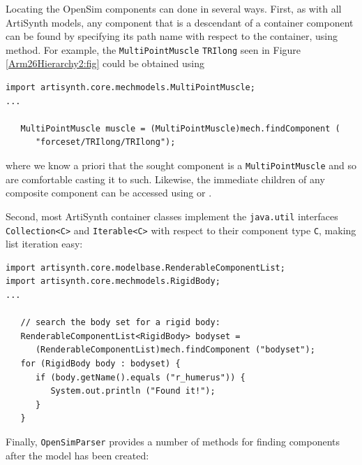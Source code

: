 Locating the OpenSim components can done in several ways.  First, as with all
ArtiSynth models, any component that is a descendant of a container component
can be found by specifying its path name with respect to the container, using
 method. For example,
the {\tt MultiPointMuscle} {\tt TRIlong} seen in Figure \ref{Arm26Hierarchy2:fig}
could be obtained using
%
\begin{lstlisting}[]
import artisynth.core.mechmodels.MultiPointMuscle;
...

   MultiPointMuscle muscle = (MultiPointMuscle)mech.findComponent (
      "forceset/TRIlong/TRIlong");
\end{lstlisting}
%
where we know a priori that the sought component is a {\tt MultiPointMuscle} and
so are comfortable casting it to such. Likewise, the immediate children
of any composite component can be accessed using 
 or
.

Second, most ArtiSynth container classes implement the {\tt java.util}
interfaces {\tt Collection<C>} and {\tt Iterable<C>} with respect to their
component type {\tt C}, making list iteration easy:
%
\begin{lstlisting}[]
import artisynth.core.modelbase.RenderableComponentList;
import artisynth.core.mechmodels.RigidBody;
...

   // search the body set for a rigid body:
   RenderableComponentList<RigidBody> bodyset =
      (RenderableComponentList)mech.findComponent ("bodyset");
   for (RigidBody body : bodyset) {
      if (body.getName().equals ("r_humerus")) {
         System.out.println ("Found it!");
      }
   }
\end{lstlisting}
%
Finally, {\tt OpenSimParser} provides a number of methods for finding
components after the model has been created:

